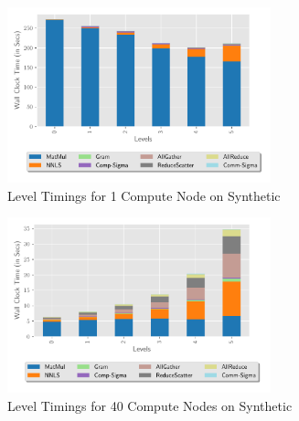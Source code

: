 
\begin{figure}
\begin{center}
\includegraphics[height=2in, width=\columnwidth]{plots/synthetic_sequential_level_breakdown.pdf}
\caption{Level Timings for 1 Compute Node on Synthetic}
\label{fig:seqlevelbreakdown}
\end{center}
\end{figure}

\begin{figure}
\begin{center}
\includegraphics[height=2in, width=\columnwidth]{plots/synthetic_parallel_level_breakdown.pdf}
\caption{Level Timings for 40 Compute Nodes on Synthetic}
\label{fig:parallellevelbreakdown}
\end{center}
\end{figure}





